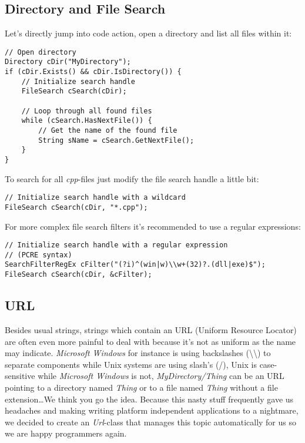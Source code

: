 \subsection{Directory and File Search}
Let's directly jump into code action, open a directory and list all files within it:

\begin{lstlisting}[caption=Directory and file search usage example]
// Open directory
Directory cDir("MyDirectory");
if (cDir.Exists() && cDir.IsDirectory()) {
	// Initialize search handle
	FileSearch cSearch(cDir);

	// Loop through all found files
	while (cSearch.HasNextFile()) {
		// Get the name of the found file
		String sName = cSearch.GetNextFile();
	}
}
\end{lstlisting}

To search for all \emph{cpp}-files just modify the file search handle a little bit:

\begin{lstlisting}[caption=Wildcard search handle]
// Initialize search handle with a wildcard
FileSearch cSearch(cDir, "*.cpp");
\end{lstlisting}

For more complex file search filters it's recommended to use a regular expressions:

\begin{lstlisting}[caption=Regular expression search handle]
// Initialize search handle with a regular expression
// (PCRE syntax)
SearchFilterRegEx cFilter("(?i)^(win|w)\\w+(32)?.(dll|exe)$");
FileSearch cSearch(cDir, &cFilter);
\end{lstlisting}




\subsection{URL}
Besides usual strings, strings which contain an URL (Uniform Resource Locator) are often even more painful to deal with because it's not as uniform as the name may indicate. \emph{Microsoft Windows} for instance is using backslashes (\textbackslash\textbackslash) to separate components while Unix systems are using slash's (/), Unix is case-sensitive while \emph{Microsoft Windows} is not, \emph{MyDirectory/Thing} can be an URL pointing to a directory named \emph{Thing} or to a file named \emph{Thing} without a file extension\ldots We think you go the idea. Because this nasty stuff frequently gave us headaches and making writing platform independent applications to a nightmare, we decided to create an \emph{Url}-class that manages this topic automatically for us so we are happy programmers again.

